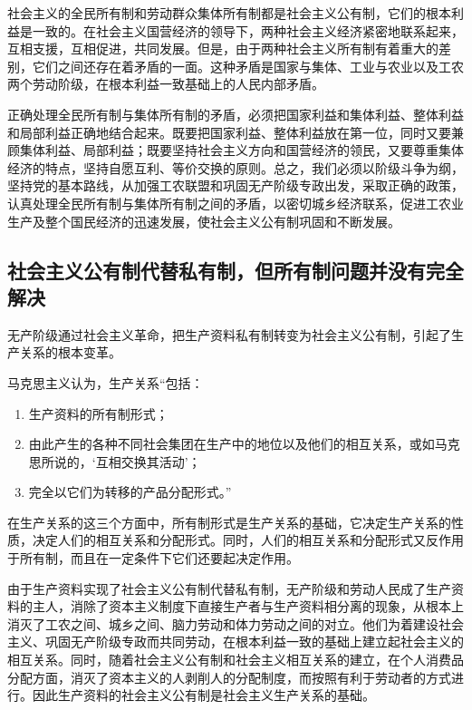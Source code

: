 \documentclass{book}
\begin{document}
社会主义的全民所有制和劳动群众集体所有制都是社会主义公有制，它们的根本利益是一致的。在社会主义国营经济的领导下，两种社会主义经济紧密地联系起来，互相支援，互相促进，共同发展。但是，由于两种社会主义所有制有着重大的差别，它们之间还存在着矛盾的一面。这种矛盾是国家与集体、工业与农业以及工农两个劳动阶级，在根本利益一致基础上的人民内部矛盾。

正确处理全民所有制与集体所有制的矛盾，必须把国家利益和集体利益、整体利益和局部利益正确地结合起来。既要把国家利益、整体利益放在第一位，同时又要兼顾集体利益、局部利益；既要坚持社会主义方向和国营经济的领民，又要尊重集体经济的特点，坚持自愿互利、等价交换的原则。总之，我们必须以阶级斗争为纲，坚持党的基本路线，从加强工农联盟和巩固无产阶级专政出发，采取正确的政策，认真处理全民所有制与集体所有制之间的矛盾，以密切城乡经济联系，促进工农业生产及整个国民经济的迅速发展，使社会主义公有制巩固和不断发展。

\subsection{社会主义公有制代替私有制，但所有制问题并没有完全解决}

无产阶级通过社会主义革命，把生产资料私有制转变为社会主义公有制，引起了生产关系的根本变革。

马克思主义认为，生产关系“包括：

  \begin{enumerate}

\item 生产资料的所有制形式；
\item 由此产生的各种不同社会集团在生产中的地位以及他们的相互关系，或如马克思所说的，‘互相交换其活动’；
\item 完全以它们为转移的产品分配形式。”

    \end{enumerate}

在生产关系的这三个方面中，所有制形式是生产关系的基础，它决定生产关系的性质，决定人们的相互关系和分配形式。同时，人们的相互关系和分配形式又反作用于所有制，而且在一定条件下它们还要起决定作用。

由于生产资料实现了社会主义公有制代替私有制，无产阶级和劳动人民成了生产资料的主人，消除了资本主义制度下直接生产者与生产资料相分离的现象，从根本上消灭了工农之间、城乡之间、脑力劳动和体力劳动之间的对立。他们为着建设社会主义、巩固无产阶级专政而共同劳动，在根本利益一致的基础上建立起社会主义的相互关系。同时，随着社会主义公有制和社会主义相互关系的建立，在个人消费品分配方面，消灭了资本主义的人剥削人的分配制度，而按照有利于劳动者的方式进行。因此生产资料的社会主义公有制是社会主义生产关系的基础。
\end{document}
